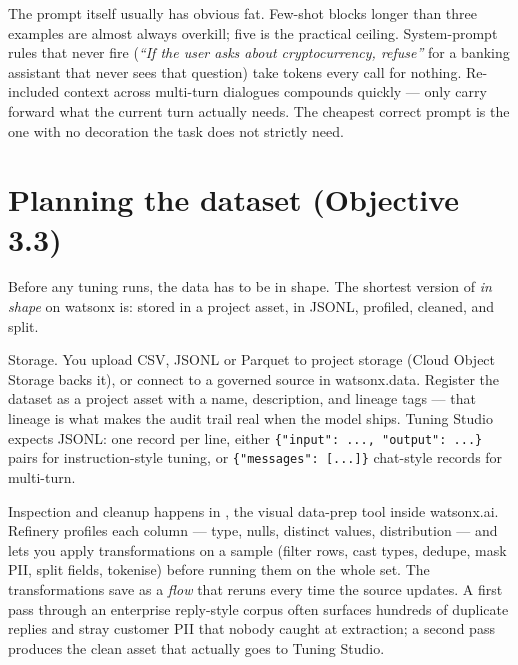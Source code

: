 The prompt itself usually has obvious fat. Few-shot blocks longer than three examples are almost always overkill; five is the practical ceiling. System-prompt rules that never fire (\emph{``If the user asks about cryptocurrency, refuse''} for a banking assistant that never sees that question) take tokens every call for nothing. Re-included context across multi-turn dialogues compounds quickly --- only carry forward what the current turn actually needs. The cheapest correct prompt is the one with no decoration the task does not strictly need.


\section{Planning the dataset (Objective 3.3)}

Before any tuning runs, the data has to be in shape. The shortest version of \emph{in shape} on watsonx is: stored in a project asset, in JSONL, profiled, cleaned, and split.

Storage. You upload CSV, JSONL or Parquet to project storage (Cloud Object Storage backs it), or connect to a governed source in watsonx.data. Register the dataset as a project asset with a name, description, and lineage tags --- that lineage is what makes the audit trail real when the model ships. Tuning Studio expects JSONL: one record per line, either \verb|{"input": ..., "output": ...}| pairs for instruction-style tuning, or \verb|{"messages": [...]}| chat-style records for multi-turn.

Inspection and cleanup happens in , the visual data-prep tool inside watsonx.ai. Refinery profiles each column --- type, nulls, distinct values, distribution --- and lets you apply transformations on a sample (filter rows, cast types, dedupe, mask PII, split fields, tokenise) before running them on the whole set. The transformations save as a \emph{flow} that reruns every time the source updates. A first pass through an enterprise reply-style corpus often surfaces hundreds of duplicate replies and stray customer PII that nobody caught at extraction; a second pass produces the clean asset that actually goes to Tuning Studio.

